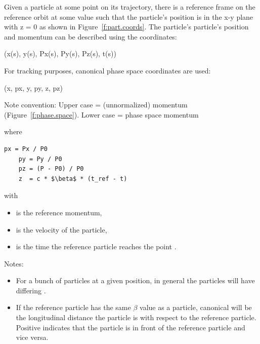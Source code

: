 \documentclass{hitec}
\begin{document}
Given a particle at some point on its trajectory, there is a reference frame on the reference orbit
at some  value such that the particle's position is in the x-y plane with z = 0 as shown
in Figure~\ref{f:part.coords}. The
particle's particle's position and momentum  can be described using the coordinates:
\begin{code}
    (x(s), y(s), Px(s), Py(s), Pz(s), t(s))
\end{code}

For tracking purposes, canonical phase space coordinates are used:
\begin{code}
    (x, px, y, py, z, pz)   
\end{code}
Note convention: Upper case  = (unnormalized) momentum (Figure~\ref{f:phase.space}). Lower
case  = phase space momentum

where
\begin{lstlisting}[mathescape]
    px = Px / P0
    py = Py / P0
    pz = (P - P0) / P0
    z  = c * $\beta$ * (t_ref - t)
\end{lstlisting}
with
\begin{itemize}
\item {} is the reference momentum, 
\item \vn{$\beta$} is the velocity of the particle, 
\item {} is the time the reference particle reaches the point .
\end{itemize}

Notes:
\begin{itemize}
\item 
For a bunch of particles at a given  position, in general the particles will have differing .
\item 
If the reference particle has the same $\beta$ value as a particle, canonical  will be the
longitudinal distance the particle is with respect to the reference particle. Positive 
indicates that the particle is in front of the reference particle and vice versa.
\end{itemize}
\end{document}
